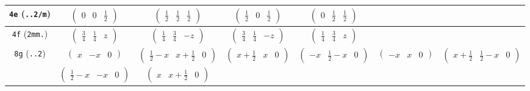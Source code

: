 \documentclass[fleqn,9pt,landscape]{jsarticle}
\begin{document}
\begin{center}
\begin{longtable}{ccccccc}
{\tt 4e} ({\tt ..2/m}) & $ \begin{pmatrix} 0 & 0 & \frac{1}{2} \end{pmatrix} $ & $ \begin{pmatrix} \frac{1}{2} & \frac{1}{2} & \frac{1}{2} \end{pmatrix} $ & $ \begin{pmatrix} \frac{1}{2} & 0 & \frac{1}{2} \end{pmatrix} $ & $ \begin{pmatrix} 0 & \frac{1}{2} & \frac{1}{2} \end{pmatrix} $ & $  $ & $  $ \\ \hline
{\tt 4f} ({\tt 2mm.}) & $ \begin{pmatrix} \frac{3}{4} & \frac{1}{4} & z \end{pmatrix} $ & $ \begin{pmatrix} \frac{1}{4} & \frac{3}{4} & - z \end{pmatrix} $ & $ \begin{pmatrix} \frac{3}{4} & \frac{1}{4} & - z \end{pmatrix} $ & $ \begin{pmatrix} \frac{1}{4} & \frac{3}{4} & z \end{pmatrix} $ & $  $ & $  $ \\ \hline
{\tt 8g} ({\tt ..2}) & $ \begin{pmatrix} x & - x & 0 \end{pmatrix} $ & $ \begin{pmatrix} \frac{1}{2} - x & x + \frac{1}{2} & 0 \end{pmatrix} $ & $ \begin{pmatrix} x + \frac{1}{2} & x & 0 \end{pmatrix} $ & $ \begin{pmatrix} - x & \frac{1}{2} - x & 0 \end{pmatrix} $ & $ \begin{pmatrix} - x & x & 0 \end{pmatrix} $ & $ \begin{pmatrix} x + \frac{1}{2} & \frac{1}{2} - x & 0 \end{pmatrix} $ \\
& $ \begin{pmatrix} \frac{1}{2} - x & - x & 0 \end{pmatrix} $ & $ \begin{pmatrix} x & x + \frac{1}{2} & 0 \end{pmatrix} $ & $  $ & $  $ & $  $ & $  $ \\ \hline

\end{longtable}
\end{center}
\end{document}
